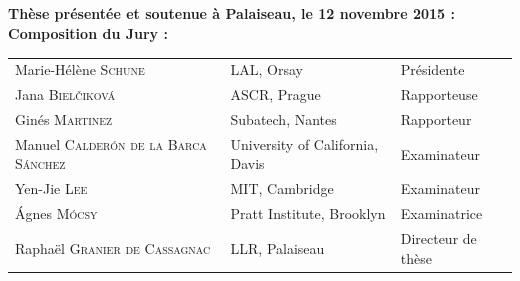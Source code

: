 \begin{titlepage}
\begin{center}
\vspace*{0.3cm} \\
\vspace*{0.6cm}\\
\vspace*{0.6cm} \\
\vspace*{0.8cm}\hspace*{0.1cm}\\ 
\vspace*{1.5cm}\hspace*{-4.6cm}\noindent \large {\textbf{Th\`{e}se pr\'{e}sent\'{e}e
    et soutenue \`{a} Palaiseau, le 12 novembre 2015 :}} \\
\vspace*{0.5cm}\hspace*{-13.1cm}\noindent \large {\textbf{Composition du Jury :}} \\

\vspace*{0.5cm}\hspace*{-1.9cm}\begin{tabular}{lll}
Marie-Hélène \textsc{Schune}& LAL, Orsay & Pr\'{e}sidente \\
Jana \textsc{Biel\v{c}iková} & ASCR, Prague & Rapporteuse \\
Ginés \textsc{Martinez} & Subatech, Nantes & Rapporteur \\
Manuel \textsc{Calderón de la Barca Sánchez} &University of California, Davis &  Examinateur \\
Yen-Jie \textsc{Lee} & MIT, Cambridge & Examinateur \\
Ágnes \textsc{Mócsy} & Pratt Institute, Brooklyn
& Examinatrice \\
Raphaël \textsc{Granier de Cassagnac} & LLR, Palaiseau & Directeur de th\`{e}se \\



\end{tabular}
\end{center}
\end{titlepage}
